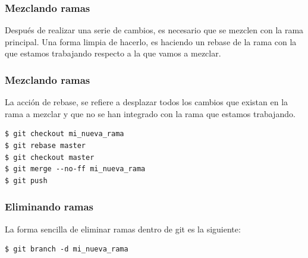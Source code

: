 \documentclass{beamer}
\begin{document}
\begin{frame}[fragile]
  \frametitle{Mezclando ramas}
  Después de realizar una serie de cambios, es necesario que se mezclen con la
rama principal. Una forma limpia de hacerlo, es haciendo un rebase de la rama
con la que estamos trabajando respecto a la que vamos a mezclar.
\end{frame}

\begin{frame}[fragile]
  \frametitle{Mezclando ramas}
  La acción de rebase, se refiere a desplazar todos los cambios que
  existan en la rama a mezclar y que no se han integrado con la rama que
  estamos trabajando.

\begin{verbatim}
$ git checkout mi_nueva_rama
$ git rebase master
$ git checkout master
$ git merge --no-ff mi_nueva_rama
$ git push
\end{verbatim}

\end{frame}

\begin{frame}[fragile]
  \frametitle{Eliminando ramas}
  La forma sencilla de eliminar ramas dentro de git es la siguiente:

\begin{verbatim}
$ git branch -d mi_nueva_rama
\end{verbatim}


\end{frame}
\end{document}
